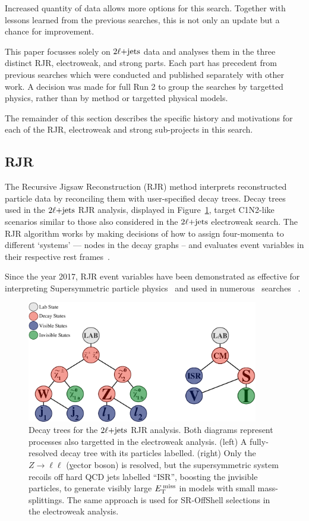 Increased quantity of data allows more options for this search.
Together with lessons learned from the previous searches, this is not only
an update but a chance for improvement.

This paper focusses solely on $2\ell\mathrm{+jets}$ data and analyses them in the three
distinct RJR, electroweak, and strong parts.
Each part has precedent from previous searches which were conducted and
published separately with other work.
A decision was made for full Run 2 to group the searches by targetted physics,
rather than by method or targetted physical models.

The remainder of this section describes the specific history and motivations
for each of the RJR, electroweak and strong sub-projects in this search.

\subsection{RJR}
The Recursive Jigsaw Reconstruction (RJR) method interprets reconstructed
particle data by reconciling them with user-specified decay trees.
Decay trees used in the $2\ell\mathrm{+jets}$ RJR analysis,
displayed in Figure~\ref{fig:2ljets_rjr_decay_trees},
target C1N2-like scenarios similar to those also considered in the $2\ell\mathrm{+jets}$
electroweak search.
The RJR algorithm works by making decisions of how to assign four-momenta
to different `systems' --- nodes in the decay graphs -- and evaluates event
variables in their respective rest
frames~\cite{jackson2017sparticles, jackson2017rjr}.

Since the year 2017, RJR event variables have been demonstrated as effective
for interpreting Supersymmetric particle
physics~\cite{santoni2018probing}
and used in numerous \atlas\
searches~\cite{SUSY-2016-07, SUSY-2016-15, SUSY-2016-16} .

\begin{figure}[tp]
\centering
\includegraphics[width=0.9\textwidth]{figures/2ljets_rjr_trees.pdf}
\caption{%
Decay trees for the $2\ell\mathrm{+jets}$ RJR analysis.
Both diagrams represent processes also targetted in the electroweak analysis.
(left) A fully-resolved decay tree with its particles labelled.
(right) Only the $Z\rightarrow\ell\ell$ (\underline{v}ector boson)
is resolved, but the supersymmetric system recoils off
hard QCD jets labelled ``ISR'', boosting the \underline{i}nvisible particles,
to generate visibly large $E_\mathrm{T}^\mathrm{\:miss}$ in models with small mass-splittings.
The same approach is used for SR-OffShell selections in the electroweak
analysis.
}
\label{fig:2ljets_rjr_decay_trees}
\end{figure}



